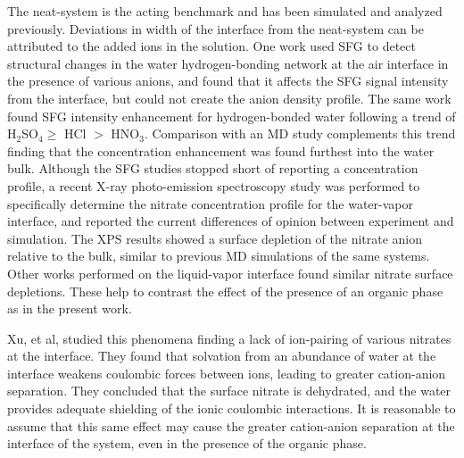 The neat-\airwat system is the acting benchmark and has been simulated and analyzed previously.\cite{Wick2006c,Hore2008,Wick2008a} Deviations in width of the interface from the neat-\ctcwat system can be attributed to the added ions in the solution. One work used SFG to detect structural changes in the water hydrogen-bonding network at the air interface in the presence of various anions, and found that it affects the SFG signal intensity from the interface, but could not create the anion density profile\cite{Schnitzer2000}. The same work found SFG intensity enhancement for hydrogen-bonded water following a trend of H$_2$SO$_4\ge$ HCl $>$ HNO$_3$. Comparison with an \airwat MD study complements this trend finding that the \sul concentration enhancement was found furthest into the water bulk.\cite{Salvador2003} Although the SFG studies stopped short of reporting a concentration profile, a recent X-ray photo-emission spectroscopy study was performed to specifically determine the nitrate concentration profile for the water-vapor interface, and reported the current differences of opinion between experiment and simulation.\cite{Brown2009} The XPS results showed a surface depletion of the nitrate anion relative to the bulk, similar to previous MD simulations of the same systems. Other works performed on the liquid-vapor interface found similar nitrate surface depletions.\cite{Otten2007} These help to contrast the effect of the presence of an organic phase as in the present work. 

Xu, et al, studied this phenomena finding a lack of ion-pairing of various nitrates at the \airwat interface.\cite{Xu2009} They found that solvation from an abundance of water at the interface weakens coulombic forces between ions, leading to greater cation-anion separation. They concluded that the surface nitrate is dehydrated, and the water provides adequate shielding of the ionic coulombic interactions. It is reasonable to assume that this same effect may cause the greater cation-anion separation at the interface of the \sodnit system, even in the presence of the organic phase.

